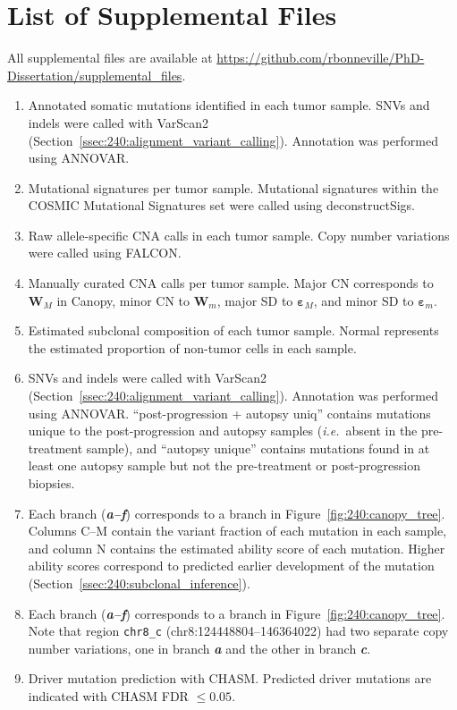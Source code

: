 \section{List of Supplemental Files}
All supplemental files are available at \url{https://github.com/rbonneville/PhD-Dissertation/supplemental_files}.
\begin{enumerate}
    \renewcommand*{\labelenumi}{S\thechapter{}.\arabic{enumi}. }
    \item Annotated somatic mutations identified in each tumor sample. SNVs and indels were called with VarScan2 (Section~\ref{ssec:240:alignment_variant_calling}). Annotation was performed using ANNOVAR.
    \item Mutational signatures per tumor sample. Mutational signatures within the COSMIC Mutational Signatures set were called using deconstructSigs.
    \item Raw allele-specific CNA calls in each tumor sample. Copy number variations were called using FALCON.
    \item Manually curated CNA calls per tumor sample. Major CN corresponds to $\mathbf{W}_M$ in Canopy, minor CN to $\mathbf{W}_m$, major SD to $\mathbf{\varepsilon}_M$, and minor SD to $\mathbf{\varepsilon}_m$.
    \item Estimated subclonal composition of each tumor sample. Normal represents the estimated proportion of non-tumor cells in each sample.
    \item SNVs and indels were called with VarScan2 (Section~\ref{ssec:240:alignment_variant_calling}). Annotation was performed using ANNOVAR. ``post-progression + autopsy uniq'' contains mutations unique to the post-progression and autopsy samples (\textit{i.e.}\ absent in the pre-treatment sample), and ``autopsy unique'' contains mutations found in at least one autopsy sample but not the pre-treatment or post-progression biopsies.
    \item Each branch (\textbf{\textit{a--f}}) corresponds to a branch in Figure~\ref{fig:240:canopy_tree}. Columns C--M contain the variant fraction of each mutation in each sample, and column N contains the estimated ability score of each mutation. Higher ability scores correspond to predicted earlier development of the mutation (Section~\ref{ssec:240:subclonal_inference}).
    \item Each branch (\textbf{\textit{a--f}}) corresponds to a branch in Figure~\ref{fig:240:canopy_tree}. Note that region \texttt{chr8\_c} (chr8:124448804--146364022) had two separate copy number variations, one in branch \textbf{\textit{a}} and the other in branch \textbf{\textit{c}}.
    \item Driver mutation prediction with CHASM\@. Predicted driver mutations are indicated with CHASM FDR $\le 0.05$.
\end{enumerate}

